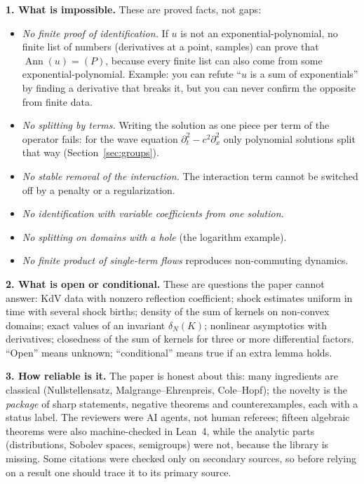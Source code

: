 \documentclass[11pt]{article}
\theoremstyle{plain}
\theoremstyle{definition}
\theoremstyle{remark}
\DeclareMathOperator{\Ann}{Ann}             %
\begin{document}
\medskip\textbf{1. What is impossible.} These are proved facts, not gaps:
\begin{itemize}[nosep]
\item \emph{No finite proof of identification.} If $u$ is not an exponential-polynomial, no finite list of numbers (derivatives at a point, samples) can prove that $\Ann(u)=(P)$, because every finite list can also come from some exponential-polynomial. Example: you can refute ``$u$ is a sum of exponentials'' by finding a derivative that breaks it, but you can never confirm the opposite from finite data.
\item \emph{No splitting by terms.} Writing the solution as one piece per term of the operator fails: for the wave equation $\partial_t^2-c^2\partial_x^2$ only polynomial solutions split that way (Section~\ref{sec:groups}).
\item \emph{No stable removal of the interaction.} The interaction term cannot be switched off by a penalty or a regularization.
\item \emph{No identification with variable coefficients from one solution.}
\item \emph{No splitting on domains with a hole} (the logarithm example).
\item \emph{No finite product of single-term flows} reproduces non-commuting dynamics.
\end{itemize}

\medskip\textbf{2. What is open or conditional.} These are questions the paper cannot answer: KdV data with nonzero reflection coefficient; shock estimates uniform in time with several shock births; density of the sum of kernels on non-convex domains; exact values of an invariant $\delta_N(K)$; nonlinear asymptotics with derivatives; closedness of the sum of kernels for three or more differential factors. ``Open'' means unknown; ``conditional'' means true if an extra lemma holds.

\medskip\textbf{3. How reliable is it.} The paper is honest about this: many ingredients are classical (Nullstellensatz, Malgrange--Ehrenpreis, Cole--Hopf); the novelty is the \emph{package} of sharp statements, negative theorems and counterexamples, each with a status label. The reviewers were AI agents, not human referees; fifteen algebraic theorems were also machine-checked in Lean~4, while the analytic parts (distributions, Sobolev spaces, semigroups) were not, because the library is missing. Some citations were checked only on secondary sources, so before relying on a result one should trace it to its primary source.
\end{document}
